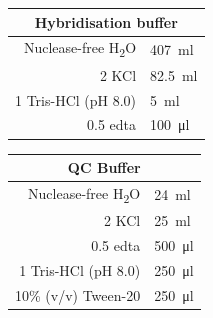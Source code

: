 \begin{appendix}
\begin{multicols}{2}

\begin{center}
\begin{tabular}{r|l}
	\multicolumn{2}{c}{Hybridisation buffer} \\
	\hline
	Nuclease-free H\textsubscript{2}O & \SI{407}{\ml} \\
	\SI{2}{\molar} KCl & \SI{82.5}{\ml} \\
	\SI{1}{\molar} Tris-HCl (pH 8.0) & \SI{5}{\ml} \\
	\SI{0.5}{\molar} \acrshort{edta} & \SI{100}{\ul} \\
\end{tabular}
\end{center}
\medskip


\begin{center}
\begin{tabular}{r|l}
	\multicolumn{2}{c}{QC Buffer} \\
	\hline
	Nuclease-free H\textsubscript{2}O & \SI{24}{\ml} \\
	\SI{2}{\molar} KCl & \SI{25}{\ml} \\
	\SI{0.5}{\molar} \acrshort{edta} & \SI{500}{\ul} \\
	\SI{1}{\molar} Tris-HCl (pH 8.0) & \SI{250}{\ul} \\
	10\% (v/v) Tween-20 & \SI{250}{\ul} \\
\end{tabular}
\end{center}
\medskip


\end{multicols}
\end{appendix}
